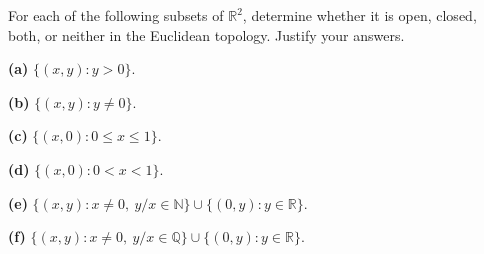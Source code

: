 \begin{problem}[CP-IV-0128]
\label{prob:cp-iv-0128}
For each of the following subsets of $\mathbb{R}^2$, determine whether it
is open, closed, both, or neither in the Euclidean topology. Justify your answers.
\par\smallskip\noindent\textbf{(a)} $\{(x,y):y>0\}$.
\par\smallskip\noindent\textbf{(b)} $\{(x,y):y\ne0\}$.
\par\smallskip\noindent\textbf{(c)} $\{(x,0):0\le x\le1\}$.
\par\smallskip\noindent\textbf{(d)} $\{(x,0):0<x<1\}$.
\par\smallskip\noindent\textbf{(e)} $\{(x,y):x\ne0,\ y/x\in\mathbb N\}\cup\{(0,y):y\in\mathbb R\}$.
\par\smallskip\noindent\textbf{(f)} $\{(x,y):x\ne0,\ y/x\in\mathbb Q\}\cup\{(0,y):y\in\mathbb R\}$.
\end{problem}

